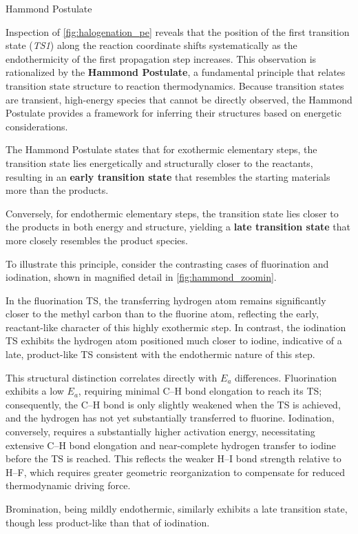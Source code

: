\documentclass[10pt]{article}
\begin{document}
    \begin{core}[label=core:hammond_postulate]{Hammond Postulate}

      Inspection of \autoref{fig:halogenation_pe} reveals that the position of the first transition state (\textit{TS1}) along the reaction coordinate shifts systematically as the endothermicity of the first propagation step increases. This observation is rationalized by the \textbf{Hammond Postulate}, a fundamental principle that relates transition state structure to reaction thermodynamics. Because transition states are transient, high-energy species that cannot be directly observed, the Hammond Postulate provides a framework for inferring their structures based on energetic considerations.

      The Hammond Postulate states that for exothermic elementary steps, the transition state lies energetically and structurally closer to the reactants, resulting in an \textbf{early transition state} that resembles the starting materials more than the products.

      Conversely, for endothermic elementary steps, the transition state lies closer to the products in both energy and structure, yielding a \textbf{late transition state} that more closely resembles the product species.

      To illustrate this principle, consider the contrasting cases of fluorination and iodination, shown in magnified detail in \autoref{fig:hammond_zoomin}.


      In the fluorination TS, the transferring hydrogen atom remains significantly closer to the methyl carbon than to the fluorine atom, reflecting the early, reactant-like character of this highly exothermic step. In contrast, the iodination TS exhibits the hydrogen atom positioned much closer to iodine, indicative of a late, product-like TS consistent with the endothermic nature of this step.

      This structural distinction correlates directly with $E_a$ differences. Fluorination exhibits a low $E_a$, requiring minimal C--H bond elongation to reach its TS; consequently, the C--H bond is only slightly weakened when the TS is achieved, and the hydrogen has not yet substantially transferred to fluorine. Iodination, conversely, requires a substantially higher activation energy, necessitating extensive C--H bond elongation and near-complete hydrogen transfer to iodine before the TS is reached. This reflects the weaker H--I bond strength relative to H--F, which requires greater geometric reorganization to compensate for reduced thermodynamic driving force.

      Bromination, being mildly endothermic, similarly exhibits a late transition state, though less product-like than that of iodination.

    \end{core}
\end{document}
